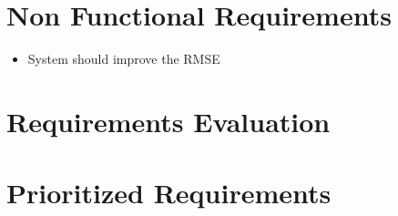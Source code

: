 \section{Non Functional Requirements}

\begin{itemize}
  \item System should improve the RMSE
\end{itemize}


\section{Requirements Evaluation}


\section{Prioritized Requirements}

